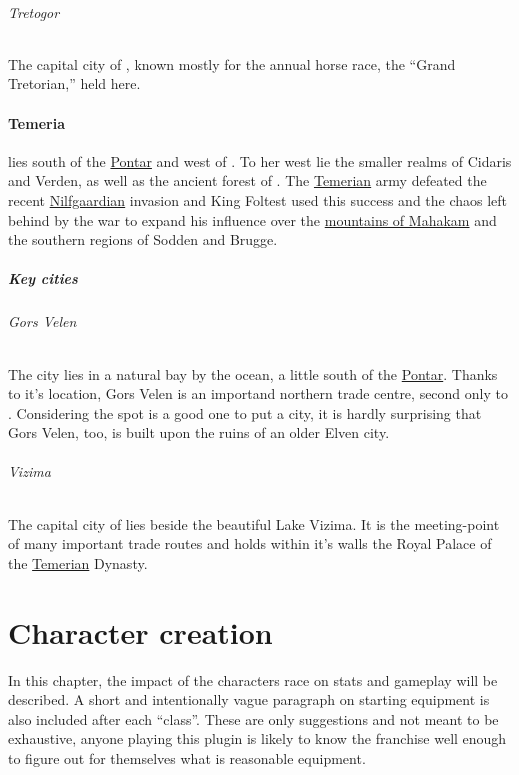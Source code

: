 \documentclass[parskip=full,11pt]{scrreport}
\begin{document}
\subparagraph{Tretogor}\label{city:tretogor}
The capital city of , known mostly for the annual horse race, the ``Grand Tretorian,'' held here.



\subsubsection{Temeria}\label{realm:temeria}
 lies south of the \hyperref[region:pontar]{Pontar} and west of . To her west lie the smaller realms of 
Cidaris and Verden, as well as the ancient forest of . The \hyperref[realm:temeria]{Temerian} army defeated the recent 
\hyperref[realm:nilfgaard]{Nilfgaardian} invasion and King Foltest used this success and the chaos left behind by the war
to expand his influence over the \hyperref[region:mahakamMtns]{mountains of Mahakam} and the southern regions of Sodden and Brugge.

\paragraph{Key cities}
\subparagraph{Gors Velen}\label{city:gors_velen}
The city lies in a natural bay by the ocean, a little south of the \hyperref[region:pontar]{Pontar}. Thanks to it's location,
Gors Velen is an importand northern trade centre, second only to . Considering the spot is a good one
to put a city, it is hardly surprising that Gors Velen, too, is built upon the ruins of an older Elven city.

\subparagraph{Vizima}\label{city:vizima}
The capital city of  lies beside the beautiful Lake Vizima. It is the meeting-point of many
important trade routes and holds within it's walls the Royal Palace of the \hyperref[realm:temeria]{Temerian} Dynasty.


\chapter{Character creation}
In this chapter, the impact of the characters race on stats and gameplay will be described. A short and intentionally vague paragraph on starting
equipment is also included after each ``class''. These are only suggestions and not meant to be exhaustive, anyone playing this plugin is likely
to know the franchise well enough to figure out for themselves what is reasonable equipment.
\end{document}
